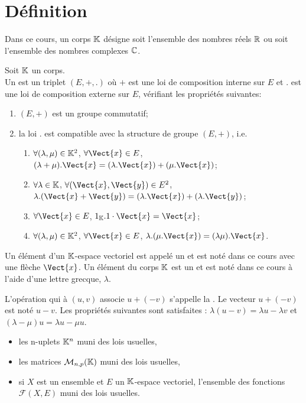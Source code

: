 \documentclass{book}
\begin{document}
\section{Définition}
Dans ce cours, un corps $\mathbb{K}$ désigne soit l'ensemble des nombres réels $\mathbb{R}$ ou soit l'ensemble des nombres complexes $\mathbb{C}$. 
\begin{Definition}
Soit $\mathbb{K}$ un corps.\\
Un  est un triplet $(E,+,.)$ où
$+$ est une loi de composition interne sur $E$ et
$.$ est une loi de composition externe sur $E$,
vérifiant les propriétés suivantes:
\begin{enumerate}
\item $(E, +)$ est un groupe commutatif;
\item la loi $.$ est compatible avec la structure de groupe $(E, +)$, i.e.  
 \begin{enumerate}
  \item $\forall(\lambda ,\mu )\in\mathbb{K}^2$, $\forall \Vect{x}\in E$, $(\lambda +\mu ) . \Vect{x} = (\lambda . \Vect{x}) + (\mu . \Vect{x})$;
  \item $\forall\lambda \in\mathbb{K}$, $\forall(\Vect{x},\Vect{y})\in E^2$, $\lambda . (\Vect{x}+\Vect{y}) = (\lambda . \Vect{x}) + (\lambda . \Vect{y})$;
  \item $\forall\Vect{x}\in E$, $1_\K. 1\cdot\Vect{x} = \Vect{x}$;
  \item $\forall(\lambda ,\mu )\in\mathbb{K}^2$, $\forall\Vect{x}\in E$, $\lambda . (\mu . \Vect{x}) = (\lambda \mu ) . \Vect{x}$.
  \end{enumerate}
\end{enumerate}
Un élément d'un $\mathbb{K}$-espace vectoriel est appelé un  et est noté dans ce cours avec une flèche  $\Vect{x}$. Un élément du corps $\mathbb{K}$ est un  et est noté dans ce cours à l'aide d'une lettre grecque, $\lambda$.   
\end{Definition}
\begin{Vocabulaire}
L'opération qui à $(u,v)$ associe $u+(-v)$ s'appelle la .
 Le vecteur $u+(-v)$ est noté $u-v$.
 Les propriétés suivantes sont satisfaites : $\lambda (u-v)=\lambda u -\lambda v$
 et $(\lambda -\mu)u=\lambda u-\mu u$.
\end{Vocabulaire}


\begin{Exemple}

\begin{itemize}
\item les n-uplets $\mathbb{K}^n$ muni des lois usuelles, 
\item
  les matrices $\mathcal{M}_{n,p}(\mathbb{K})$ muni des lois usuelles,
\item
 si $X$ est un ensemble et $E$ un $\mathbb{K}$-espace vectoriel, l'ensemble des fonctions $\mathcal{F}(X,E)$ muni des lois usuelles.
\end{itemize}
\end{Exemple}
\end{document}
